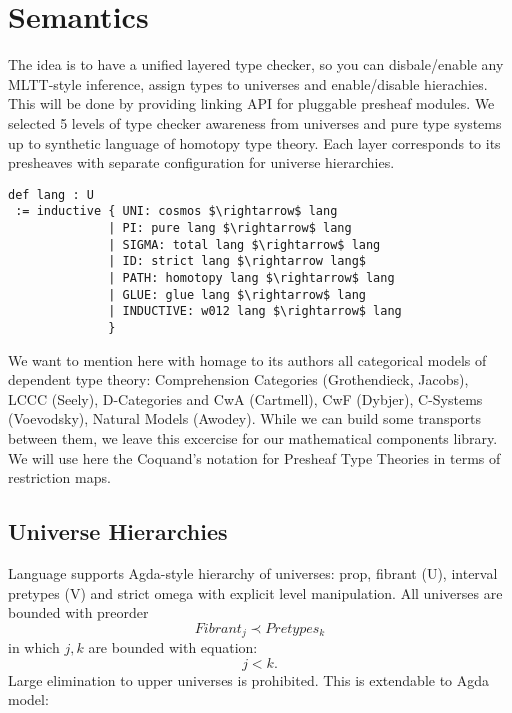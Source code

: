\documentclass{article}
\theoremstyle{definition}
\begin{document}
\newpage
\section{Semantics}
The idea is to have a unified layered type checker, so you can disbale/enable any MLTT-style inference,
assign types to universes and enable/disable hierachies. This will be done by providing linking API for
pluggable presheaf modules. We selected 5 levels of type checker awareness from universes and pure type
systems up to synthetic language of homotopy type theory. Each layer corresponds to its presheaves with
separate configuration for universe hierarchies.

\begin{lstlisting}[mathescape=true]
def lang : U
 := inductive { UNI: cosmos $\rightarrow$ lang
              | PI: pure lang $\rightarrow$ lang
              | SIGMA: total lang $\rightarrow$ lang
              | ID: strict lang $\rightarrow lang$
              | PATH: homotopy lang $\rightarrow$ lang
              | GLUE: glue lang $\rightarrow$ lang
              | INDUCTIVE: w012 lang $\rightarrow$ lang
              }
\end{lstlisting}

We want to mention here with homage to its authors all categorical models of dependent type theory:
Comprehension Categories (Grothendieck, Jacobs), LCCC (Seely), D-Categories and CwA (Cartmell),
CwF (Dybjer), C-Systems (Voevodsky), Natural Models (Awodey). While we can build some transports
between them, we leave this excercise for our mathematical components library.
We will use here the Coquand's notation for Presheaf Type Theories in terms of restriction maps.

\subsection{Universe Hierarchies}

Language supports Agda-style hierarchy of universes: prop, fibrant (U), interval pretypes (V) and
strict omega with explicit level manipulation. All universes are bounded with preorder
\begin{equation}
Fibrant_j \prec Pretypes_k
\end{equation}
in which $j,k$ are bounded with equation:
\begin{equation}
j < k.
\end{equation}
Large elimination to upper universes is prohibited. This is extendable to Agda model:
\end{document}
